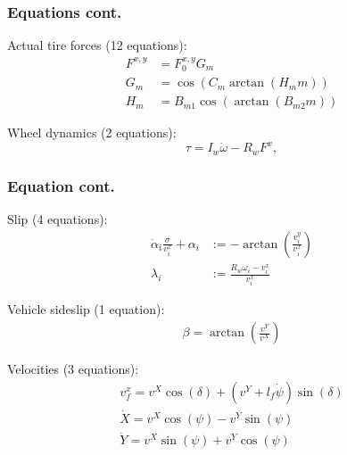 \documentclass[]{beamer}
\begin{document}
\begin{frame}
\frametitle{Equations cont.}
{\small

Actual tire forces (12 equations):
\begin{align}
F^{x,y} &= F^{x,y}_{0} G_{m}  \\
G_{m} &= \cos( C_{m} \arctan(H_{m} m) ) \\
H_{m} &= B_{m 1} \cos(\arctan(B_{m 2} m))
\end{align}

Wheel dynamics (2 equations):
\begin{equation}
\tau = I_w \dot{\omega}-R_wF^x,
\end{equation}
}
\end{frame}

\begin{frame}
\frametitle{Equation cont.}
{\small
Slip (4 equations):
	\begin{align}
		\dot{\alpha}_i \frac{\sigma}{v^x_{i}} + \alpha_i &:= -\arctan \left( \frac{v^y_{i}}{v^x_{i}} \right) \label{eq:alpha}\\
		\lambda_i &:= \frac{R_w \omega_i - v^x_{i}}{v^x_{i}}\label{eq:lambda} 
	\end{align}\label{eq:slip}%

Vehicle sideslip (1 equation):
\begin{gather} %
\beta = \arctan\left(\frac{v^Y}{v^X}\right)
\end{gather}

Velocities (3 equations):
\begin{gather}
v_f^x = v^X\cos(\delta) + (v^Y+l_f\dot \psi)\sin(\delta) \\
\dot X = v^X\cos(\psi) - v^Y\sin(\psi) \\
\dot Y = v^X\sin(\psi) + v^Y\cos(\psi)
\end{gather}
}
\end{frame}
\end{document}

